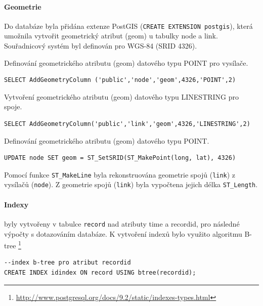 \documentclass[a4paper,12pt]{report}
\begin{document}
\paragraph*{Geometrie} Do databáze byla přidána extenze PostGIS (\texttt{CREATE EXTENSION postgis}), která umožnila vytvořit geometrický atribut (geom) u tabulky node a link. Souřadnicový systém byl definován pro WGS-84 (SRID 4326).

Definování geometrického atributu (geom) datového typu POINT pro vysílače. 

\begin{footnotesize}
\begin{lstlisting}[style=mybash]
SELECT AddGeometryColumn ('public','node','geom',4326,'POINT',2)
\end{lstlisting}
\end{footnotesize}

Vytvoření geometrického atributu (geom) datového typu LINESTRING pro spoje. 

\begin{footnotesize}
\begin{lstlisting}[style=mybash]
SELECT AddGeometryColumn('public','link','geom',4326,'LINESTRING',2)
\end{lstlisting}
\end{footnotesize}

Definování geometrického atributu (geom) datového typu POINT. 

\begin{footnotesize}
\begin{lstlisting}[style=mybash]
UPDATE node SET geom = ST_SetSRID(ST_MakePoint(long, lat), 4326)
\end{lstlisting}
\end{footnotesize}

Pomocí funkce \texttt{ST\_MakeLine} byla rekonstruována geometrie spojů (\texttt{link}) z vysílačů (\texttt{node}). Z geometrie spojů (\texttt{link}) byla vypočtena jejich délka \texttt{ST\_Length}.

\paragraph*{Indexy} byly vytvořeny v tabulce \texttt{record} nad atributy time a recordid, pro následné výpočty s dotazováním databáze. K vytvoření indexů bylo využito algoritmu B-tree \footnote{\url{http://www.postgresql.org/docs/9.2/static/indexes-types.html}}

\begin{footnotesize}
\begin{lstlisting}[style=mybash]
--index b-tree pro atribut recordid
CREATE INDEX idindex ON record USING btree(recordid);		
\end{lstlisting}
\end{footnotesize}
\end{document}
